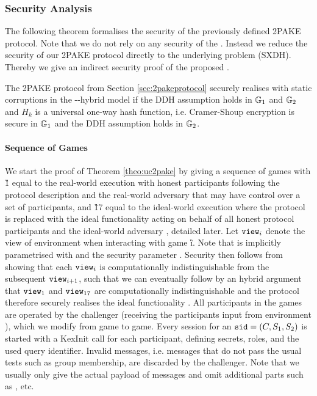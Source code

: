 \subsubsection{Security Analysis}\label{sec:2pakeproof}
The following theorem formalises the security of the previously defined 2PAKE protocol.
Note that we do not rely on any security of the \TDSPHF.
Instead we reduce the security of our 2PAKE protocol directly to the underlying problem (SXDH).
Thereby we give an indirect security proof of the proposed \TDSPHF.
 
\begin{theorem}\label{theo:uc2pake}
  The 2PAKE protocol from Section \ref{sec:2pakeprotocol} securely realises \FTWOPAKEM with static corruptions in the \Fcrs-\Fca-hybrid model if the DDH assumption holds in $\mathbb{G}_1$ and $\mathbb{G}_2$ and $H_k$ is a universal one-way hash function, i.e. Cramer-Shoup encryption is secure in $\mathbb{G}_1$ and the DDH assumption holds in $\mathbb{G}_2$.
\end{theorem}

\paragraph{Sequence of Games}
We start the proof of Theorem \ref{theo:uc2pake} by giving a sequence of games with \G{1} equal to the real-world execution with honest participants following the protocol description and the real-world adversary \cA that may have control over a set of participants, and \G{17} equal to the ideal-world execution where the protocol is replaced with the ideal functionality \FDSPHF acting on behalf of all honest protocol participants and the ideal-world adversary \SIM, detailed later.
Let $\mathtt{view}_i$ denote the view of environment \cZ when interacting with game \G{i}.
Note that \view is implicitly parametrised with \sid and the security parameter \secpar.
Security then follows from showing that each $\mathtt{view}_i$ is computationally indistinguishable from the subsequent $\mathtt{view}_{i+1}$, such that we can eventually follow by an hybrid argument that $\mathtt{view}_1$ and $\mathtt{view}_{17}$ are computationally indistinguishable and the protocol therefore securely realises the ideal functionality \FTWOPAKE.
All participants in the games are operated by the challenger \cC (receiving the participants input from environment \cZ), which we modify from game to game.
Every session for an $\mathtt{sid}=(C,S_1,S_2)$ is started with a KexInit call for each participant, defining secrets, roles, and the used query identifier.
Invalid messages, i.e. messages that do not pass the usual tests such as group membership, are discarded by the challenger.
Note that we usually only give the actual payload of messages and omit additional parts such as \sid, \qid etc.

